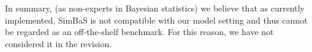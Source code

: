 \documentclass[a4paper,12pt]{article}
\begin{document}
\begin{enumerate}[label=\arabic*.,leftmargin=0.6cm]
In summary, (as non-experts in Bayesian statistics) we believe that as currently implemented, SimBaS is not compatible with our model setting and thus cannot be regarded as an off-the-shelf benchmark. For this reason, we have not considered it in the revision. 


\end{enumerate}
\end{document}
